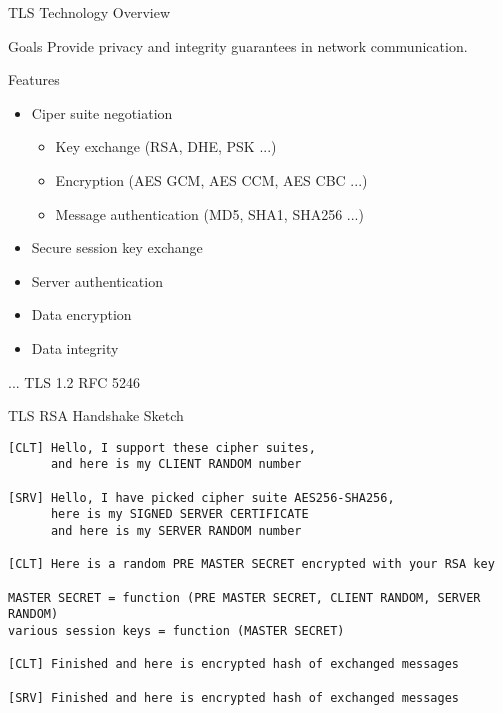 \begin{frame}{TLS Technology Overview}
    \begin{block}{Goals}
        Provide privacy and integrity guarantees in network communication.
    \end{block}

    \bigskip

    \begin{block}{Features}
        \begin{itemize}
            \item Ciper suite negotiation
            \begin{itemize}
                \item Key exchange (RSA, DHE, PSK ...)
                \item Encryption (AES GCM, AES CCM, AES CBC ...)
                \item Message authentication (MD5, SHA1, SHA256 ...)
            \end{itemize}
            \item Secure session key exchange
            \item Server authentication
            \item Data encryption
            \item Data integrity
        \end{itemize}
    \end{block}

    \hfill ... TLS 1.2 RFC 5246
\end{frame}


\begin{frame}[fragile]{TLS RSA Handshake Sketch}
\begin{lstlisting}[style=mini]
[CLT] Hello, I support these cipher suites,
      and here is my CLIENT RANDOM number

[SRV] Hello, I have picked cipher suite AES256-SHA256,
      here is my SIGNED SERVER CERTIFICATE
      and here is my SERVER RANDOM number

[CLT] Here is a random PRE MASTER SECRET encrypted with your RSA key

MASTER SECRET = function (PRE MASTER SECRET, CLIENT RANDOM, SERVER RANDOM)
various session keys = function (MASTER SECRET)

[CLT] Finished and here is encrypted hash of exchanged messages

[SRV] Finished and here is encrypted hash of exchanged messages
\end{lstlisting}
\end{frame}


